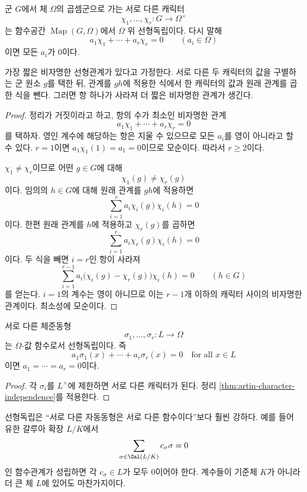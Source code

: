 \begin{theorem}
\label{thm:artin-character-independence}
군 $G$에서 체 $\Omega$의 곱셈군으로 가는 서로 다른 캐릭터
\[
  \chi_1,\dots,\chi_r:G\longrightarrow\Omega^\times
\]
는 함수공간 $\operatorname{Map}(G,\Omega)$에서 $\Omega$ 위 선형독립이다. 다시 말해
\[
  a_1\chi_1+\cdots+a_r\chi_r=0
  \qquad(a_i\in\Omega)
\]
이면 모든 $a_i$가 $0$이다.
\end{theorem}

\begin{proofidea}
가장 짧은 비자명한 선형관계가 있다고 가정한다. 서로 다른 두 캐릭터의 값을 구별하는 군 원소 $g$를 택한 뒤, 관계를 $gh$에 적용한 식에서 한 캐릭터의 값과 원래 관계를 곱한 식을 뺀다. 그러면 항 하나가 사라져 더 짧은 비자명한 관계가 생긴다.
\end{proofidea}

\begin{proof}
정리가 거짓이라고 하고, 항의 수가 최소인 비자명한 관계
\[
  a_1\chi_1+\cdots+a_r\chi_r=0
\]
를 택하자. 영인 계수에 해당하는 항은 지울 수 있으므로 모든 $a_i$를 영이 아니라고 할 수 있다. $r=1$이면 $a_1\chi_1(1)=a_1=0$이므로 모순이다. 따라서 $r\ge2$이다.

$\chi_1\ne\chi_r$이므로 어떤 $g\in G$에 대해
\[
  \chi_1(g)\ne\chi_r(g)
\]
이다. 임의의 $h\in G$에 대해 원래 관계를 $gh$에 적용하면
\[
  \sum_{i=1}^r a_i\chi_i(g)\chi_i(h)=0
\]
이다. 한편 원래 관계를 $h$에 적용하고 $\chi_r(g)$를 곱하면
\[
  \sum_{i=1}^r a_i\chi_r(g)\chi_i(h)=0
\]
이다. 두 식을 빼면 $i=r$인 항이 사라져
\[
  \sum_{i=1}^{r-1}
  a_i\bigl(\chi_i(g)-\chi_r(g)\bigr)\chi_i(h)=0
  \qquad(h\in G)
\]
를 얻는다. $i=1$의 계수는 영이 아니므로 이는 $r-1$개 이하의 캐릭터 사이의 비자명한 관계이다. 최소성에 모순이다.
\end{proof}

\begin{corollary}
\label{cor:embedding-linear-independence}
서로 다른 체준동형
\[
  \sigma_1,\dots,\sigma_r:L\longrightarrow\Omega
\]
는 $\Omega$-값 함수로서 선형독립이다. 즉
\[
  a_1\sigma_1(x)+\cdots+a_r\sigma_r(x)=0
  \quad\text{for all }x\in L
\]
이면 $a_1=\cdots=a_r=0$이다.
\end{corollary}

\begin{proof}
각 $\sigma_i$를 $L^\times$에 제한하면 서로 다른 캐릭터가 된다. 정리 \ref{thm:artin-character-independence}를 적용한다.
\end{proof}

\begin{remark}
선형독립은 ``서로 다른 자동동형은 서로 다른 함수이다''보다 훨씬 강하다. 예를 들어 유한 갈루아 확장 $L/K$에서
\[
  \sum_{\sigma\in\Gal(L/K)}c_\sigma\sigma=0
\]
인 함수관계가 성립하면 각 $c_\sigma\in L$가 모두 $0$이어야 한다. 계수들이 기준체 $K$가 아니라 더 큰 체 $L$에 있어도 마찬가지이다.
\end{remark}

